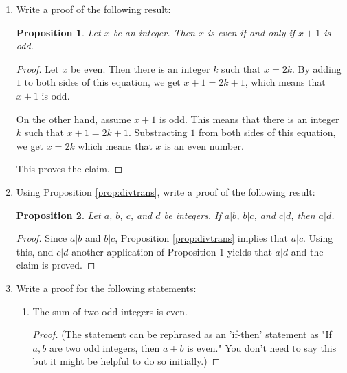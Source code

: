 \documentclass[11pt]{preprint}
\newtheorem{proposition}{Proposition}
\begin{document}
\begin{enumerate}
\item Write a proof of the following result:
\begin{proposition}
Let $x$ be an integer. Then $x$ is even if and only if $x+1$ is odd.
\end{proposition}

\begin{proof}
Let $x$ be even. Then there is an integer $k$ such that $x=2k$. By adding $1$ to both sides of this equation, we get $x+1=2k+1$, which means that $x+1$ is odd.

On the other hand, assume $x+1$ is odd. This means that there is an integer $k$ such that $x+1=2k+1$. Substracting $1$ from both sides of this equation, we get $x=2k$ which means that $x$ is an even number.

This proves the claim.
\end{proof}



\item Using Proposition \ref{prop:divtrans}, write a proof of the following result:

\begin{proposition}
Let $a$, $b$, $c$, and $d$ be integers. If $a|b$, $b|c$, and $c|d$, then $a|d$.
\end{proposition}

\begin{proof}
Since $a|b$ and $b|c$, Proposition \ref{prop:divtrans} implies that $a|c$. Using this, and $c|d$ another application of Proposition 1 yields that $a|d$ and the claim is proved.
\end{proof}

\item Write a proof for the following statements:
\begin{enumerate}
\item The sum of two odd integers is even.

\begin{proof}
(The statement can be rephrased as an 'if-then' statement as "If $a,b$ are two odd integers, then $a+b$ is even." You don't need to say this but it might be helpful to do so initially.)


\end{proof}
\end{enumerate}
\end{enumerate}
\end{document}

